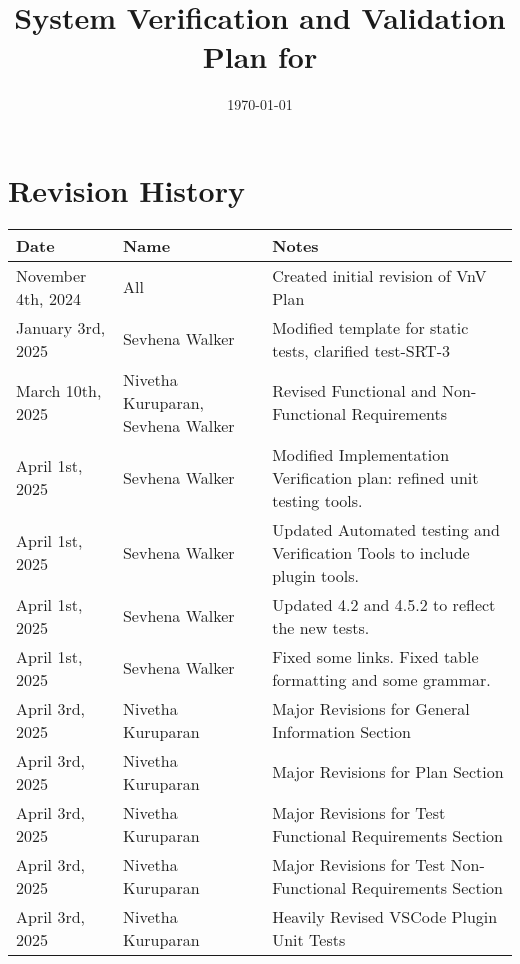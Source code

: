 \documentclass[12pt, titlepage]{article}
\begin{document}
\title{System Verification and Validation Plan for \progname{}}
\author{\authname}
\date{\today}

\maketitle


\section*{Revision History}

\begin{tabularx}{\textwidth}{p{4cm}p{4cm}X}
  \toprule {\bf Date} & {\bf Name} & {\bf Notes}\\
  \midrule
  November 4th, 2024 & All & Created initial revision of VnV Plan\\
January 3rd, 2025 & Sevhena Walker & Modified template for static tests, clarified test-SRT-3\\
  March 10th, 2025 & Nivetha Kuruparan, Sevhena Walker & Revised Functional and Non-Functional Requirements\\
  April 1st, 2025 & Sevhena Walker & Modified Implementation Verification plan: refined unit testing tools.\\
  April 1st, 2025 & Sevhena Walker & Updated Automated testing and Verification Tools to include plugin tools.\\
  April 1st, 2025 & Sevhena Walker & Updated 4.2 and 4.5.2 to reflect the new tests.\\
  April 1st, 2025 & Sevhena Walker & Fixed some links. Fixed table formatting and some grammar.\\
  April 3rd, 2025 & Nivetha Kuruparan & Major Revisions for General Information Section\\
  April 3rd, 2025 & Nivetha Kuruparan & Major Revisions for Plan Section\\
  April 3rd, 2025 & Nivetha Kuruparan & Major Revisions for Test Functional Requirements Section\\
  April 3rd, 2025 & Nivetha Kuruparan & Major Revisions for Test Non-Functional Requirements Section\\
  April 3rd, 2025 & Nivetha Kuruparan & Heavily Revised VSCode Plugin Unit Tests\\
  \bottomrule
\end{tabularx}

~\\
\end{document}
